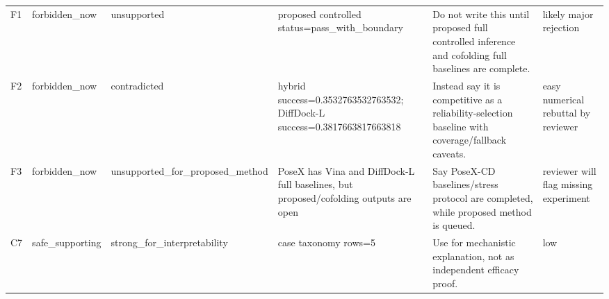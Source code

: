 \begin{tabular}{llllll}
F1 & forbidden\_now & unsupported & proposed controlled status=pass\_with\_boundary & Do not write this until proposed full controlled inference and cofolding full baselines are complete. & likely major rejection \\
F2 & forbidden\_now & contradicted & hybrid success=0.3532763532763532; DiffDock-L success=0.3817663817663818 & Instead say it is competitive as a reliability-selection baseline with coverage/fallback caveats. & easy numerical rebuttal by reviewer \\
F3 & forbidden\_now & unsupported\_for\_proposed\_method & PoseX has Vina and DiffDock-L full baselines, but proposed/cofolding outputs are open & Say PoseX-CD baselines/stress protocol are completed, while proposed method is queued. & reviewer will flag missing experiment \\
C7 & safe\_supporting & strong\_for\_interpretability & case taxonomy rows=5 & Use for mechanistic explanation, not as independent efficacy proof. & low \\
\bottomrule
\end{tabular}
